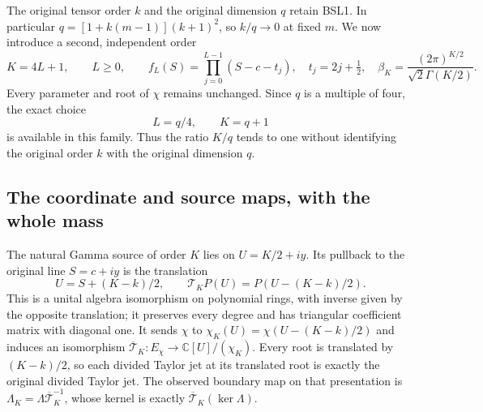 \documentclass[11pt,a4paper]{article}
\begin{document}
The original tensor order $k$ and the original dimension $q$ retain
BSL1. In particular $q=[1+k(m-1)](k+1)^2$, so $k/q\to0$ at
fixed $m$. We now introduce a second, independent order
\[
 K=4L+1,\qquad L\geq0,\qquad
 f_L(S)=\prod_{j=0}^{L-1}(S-c-t_j),\quad t_j=2j+\tfrac12,
 \quad \beta_K=\frac{(2\pi)^{K/2}}{\sqrt2\Gamma(K/2)}.
 \tag{IKO1}
\]
Every parameter and root of $\chi$ remains unchanged. Since $q$ is a
multiple of four, the exact choice
\[
 L=q/4,\qquad K=q+1
 \tag{IKO2}
\]
is available in this family. Thus the ratio $K/q$ tends to one without
identifying the original order $k$ with the original dimension $q$.

\subsection{The coordinate and source maps, with the whole mass}
The natural Gamma source of order $K$ lies on $U=K/2+iy$.
Its pullback to the original line $S=c+iy$ is the translation
\[
 U=S+(K-k)/2,\qquad
 \mathcal T_KP(U)=P(U-(K-k)/2).
 \tag{IKO3}
\]
This is a unital algebra isomorphism on polynomial rings, with inverse
given by the opposite translation; it preserves every degree and has
triangular coefficient matrix with diagonal one. It sends $\chi$ to
$\chi_K(U)=\chi(U-(K-k)/2)$ and induces an isomorphism
$\overline{\mathcal T}_K:E_\chi\to\mathbb C[U]/(\chi_K)$.
Every root is translated by $(K-k)/2$, so each divided Taylor jet at
its translated root is exactly the original divided Taylor jet.
The observed boundary map on that presentation is
$\Lambda_K=\Lambda\overline{\mathcal T}_K^{-1}$, whose kernel is
exactly $\overline{\mathcal T}_K(\ker\Lambda)$.
\end{document}

